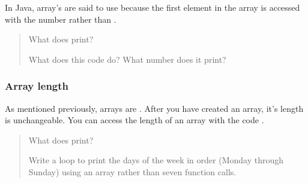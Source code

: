 \documentclass[letterpaper,10pt,english,openany,oneside]{sphinxmanual}
\begin{document}
\begin{sphinxVerbatim}[commandchars=\\\{\}]
\PYG{p}{[}\PYG{p}{]}    
\end{sphinxVerbatim}

In Java, array’s are said to use  because the first element in the array is accessed with the number  rather than .
\begin{quote}

 What does  print?

 What does this code do? What number does it print?

\begin{sphinxVerbatim}[commandchars=\\\{\}]
   
\PYG{p}{[}\PYG{p}{]}           
         
      \PYG{p}{[}\PYG{p}{]}
  
\end{sphinxVerbatim}
\end{quote}


\subsubsection{Array length}
\label{\detokenize{arrays-arraylists:array-length}}
As mentioned previously, arrays are . After you have created an array, it’s length is unchangeable. You can access the length of an array  with the code .
\begin{quote}

 What does  print?

 Write a  loop to print the days of the week in order (Monday through Sunday) using an array rather than seven  function calls.
\end{quote}
\end{document}
